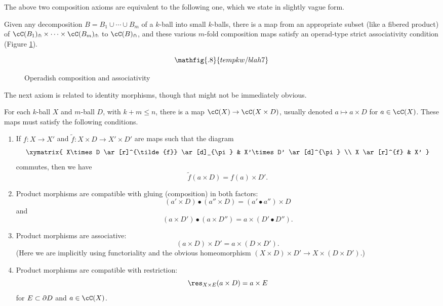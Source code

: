 The above two composition axioms are equivalent to the following one,
which we state in slightly vague form.

{Given any decomposition $B = B_1\cup\cdots\cup B_m$ of a $k$-ball
into small $k$-balls, there is a 
map from an appropriate subset (like a fibered product) 
of $\cC(B_1)\spl\times\cdots\times\cC(B_m)\spl$ to $\cC(B)\spl$,
and these various $m$-fold composition maps satisfy an
operad-type strict associativity condition (Figure \ref{blah7}).}

\begin{figure}[!ht]
$$\mathfig{.8}{tempkw/blah7}$$
\caption{Operadish composition and associativity}\label{blah7}\end{figure}

The next axiom is related to identity morphisms, though that might not be immediately obvious.

\begin{axiom}
For each $k$-ball $X$ and $m$-ball $D$, with $k+m \le n$, there is a map $\cC(X)\to \cC(X\times D)$, usually denoted $a\mapsto a\times D$ for $a\in \cC(X)$. These maps must satisfy the following conditions.
\begin{enumerate}
\item
If $f:X\to X'$ and $\tilde{f}:X\times D \to X'\times D'$ are maps such that the diagram
\[ \xymatrix{
	X\times D \ar[r]^{\tilde{f}} \ar[d]_{\pi} & X'\times D' \ar[d]^{\pi} \\
	X \ar[r]^{f} & X'
} \]
commutes, then we have 
\[
	\tilde{f}(a\times D) = f(a)\times D' .
\]
\item
Product morphisms are compatible with gluing (composition) in both factors:
\[
	(a'\times D)\bullet(a''\times D) = (a'\bullet a'')\times D
\]
and
\[
	(a\times D')\bullet(a\times D'') = a\times (D'\bullet D'') .
\]
\item
Product morphisms are associative:
\[
	(a\times D)\times D' = a\times (D\times D') .
\]
(Here we are implicitly using functoriality and the obvious homeomorphism
$(X\times D)\times D' \to X\times(D\times D')$.)
\item
Product morphisms are compatible with restriction:
\[
	\res_{X\times E}(a\times D) = a\times E
\]
for $E\subset \partial D$ and $a\in \cC(X)$.
\end{enumerate}
\end{axiom}


